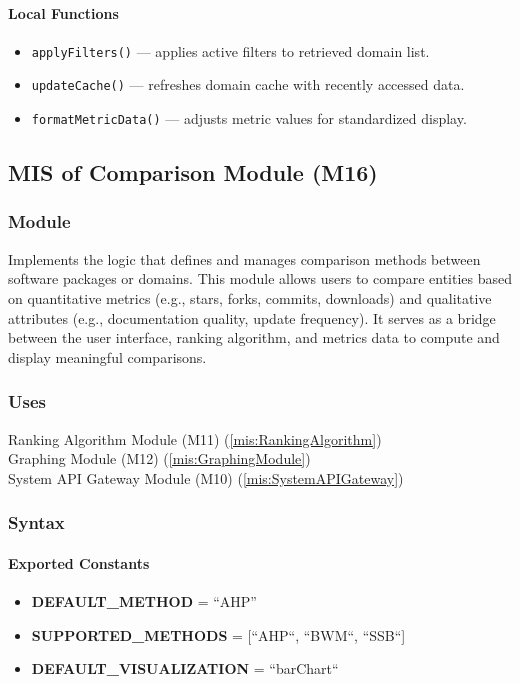 \documentclass[12pt, titlepage]{article}
\begin{document}
\paragraph{Local Functions}
\begin{itemize}
  \item \texttt{applyFilters()} — applies active filters to retrieved domain list.
  \item \texttt{updateCache()} — refreshes domain cache with recently accessed data.
  \item \texttt{formatMetricData()} — adjusts metric values for standardized display.
\end{itemize}


\subsection{MIS of Comparison Module (M16)}
\label{mis:Comparison}

\subsubsection{Module}
Implements the logic that defines and manages comparison methods between software packages or domains.
This module allows users to compare entities based on quantitative metrics (e.g., stars, forks, commits, downloads) and qualitative attributes (e.g., documentation quality, update frequency).
It serves as a bridge between the user interface, ranking algorithm, and metrics data to compute and display meaningful comparisons.

\subsubsection{Uses}
Ranking Algorithm Module (M11) (\ref{mis:RankingAlgorithm})\\
Graphing Module (M12)  (\ref{mis:GraphingModule})\\
System API Gateway Module (M10)  (\ref{mis:SystemAPIGateway})

\subsubsection{Syntax}

\paragraph{Exported Constants}
\begin{itemize}
  \item \textbf{DEFAULT\_METHOD} = ``AHP''
  \item \textbf{SUPPORTED\_METHODS} = [``AHP``, ``BWM``, ``SSB``]
  \item \textbf{DEFAULT\_VISUALIZATION} = ``barChart``
\end{itemize}
\end{document}
